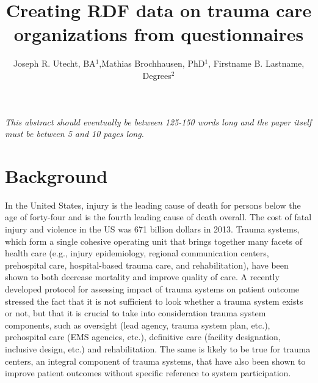 \documentclass{amia}
\begin{document}
\title{Creating RDF data on trauma care organizations from questionnaires}

\author{Joseph R. Utecht, BA$^{1}$,Mathias Brochhausen, PhD$^{1}$, Firstname B. Lastname, Degrees$^{2}$}


\maketitle


\textit{This abstract should eventually be between 125-150 words long and the paper itself must be between 5 and 10 pages long.}

\section*{Background}
In the United States, injury is the leading cause of death for persons below the age of forty-four and is the fourth leading cause of death overall. The cost of fatal injury and violence in the US was 671 billion dollars in 2013. Trauma systems, which form a single cohesive operating unit that brings together many facets of health care (e.g., injury epidemiology, regional communication centers, prehospital care, hospital-based trauma care, and rehabilitation), have been shown to both decrease mortality and improve quality of care. A recently developed protocol for assessing impact of trauma systems on patient outcome stressed the fact that it is not sufficient to look whether a trauma system exists or not, but that it is crucial to take into consideration trauma system components, such as oversight (lead agency, trauma system plan, etc.), prehospital care (EMS agencies, etc.), definitive care (facility designation, inclusive design, etc.) and rehabilitation. The same is likely to be true for trauma centers, an integral component of trauma systems, that have also been shown to improve patient outcomes without specific reference to system participation. 
\end{document}
